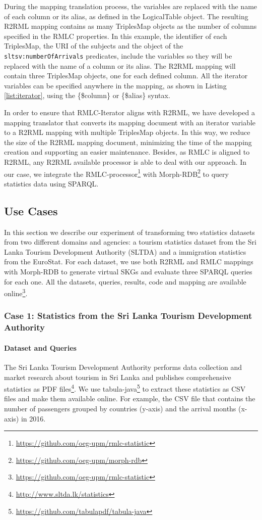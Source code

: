 During the mapping translation process, the variables are replaced with the name of each column or its alias, as defined in the LogicalTable object. The resulting R2RML mapping contains as many TriplesMap objects as the number of columns specified in the RMLC properties. In this example, the identifier of each TriplesMap, the URI of the subjects and the object of the \texttt{sltsv:numberOfArrivals} predicates, include the variables so they will be replaced with the name of a column or its alias. The R2RML mapping will contain three TriplesMap objects, one for each defined column. All the iterator variables can be specified anywhere in the mapping, as shown in Listing \ref{list:iterator}, using the \{\$column\} or \{\$alias\} syntax.

In order to ensure that RMLC-Iterator aligns with R2RML, we have developed a mapping translator that converts its mapping document with an iterator variable to a R2RML mapping with multiple TriplesMap objects. In this way, we reduce the size of the R2RML mapping document, minimizing the time of the mapping creation and supporting an easier maintenance. Besides, as RMLC is aligned to R2RML, any R2RML available processor is able to deal with our approach. In our case, we integrate the RMLC-processor\footnote{\url{https://github.com/oeg-upm/rmlc-statistic}} with Morph-RDB\footnote{\url{https://github.com/oeg-upm/morph-rdb}} to query statistics data using SPARQL.

\subsection{Use Cases}
In this section we describe our experiment of transforming two statistics datasets from two different domains and agencies: a tourism statistics dataset from the Sri Lanka Tourism Development Authority (SLTDA) and a immigration statistics from the EuroStat. For each dataset, we use both R2RML and RMLC mappings with Morph-RDB to generate virtual SKGs and evaluate three SPARQL queries for each one. All the datasets, queries, results, code and mapping are available online\footnote{\url{https://github.com/oeg-upm/rmlc-statistic}}.

\subsubsection{Case 1: Statistics from the Sri Lanka Tourism Development Authority}
\noindent\paragraph{Dataset and Queries}
The Sri Lanka Tourism Development Authority performs data collection and market research about tourism in Sri Lanka and publishes comprehensive statistics as PDF files\footnote{\url{http://www.sltda.lk/statistics}}. We use tabula-java\footnote{\url{https://github.com/tabulapdf/tabula-java}} to extract these statistics as CSV files and make them available online. For example, the CSV file that contains the number of passengers grouped by countries (y-axis) and the arrival months (x-axis) in 2016.

